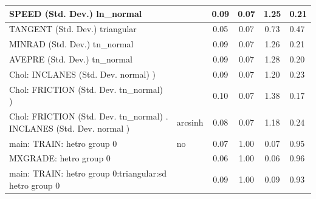 \begin{table}
\begin{center}
\begin{tabular}{|l|l|c|c|c|l|}
			\hline
			SPEED (Std. Dev.) ln_normal &  & 0.09 & 0.07 & 1.25 & 0.21 \\
			\hline
			TANGENT (Std. Dev.) triangular &  & 0.05 & 0.07 & 0.73 & 0.47 \\
			\hline
			MINRAD (Std. Dev.) tn_normal &  & 0.09 & 0.07 & 1.26 & 0.21 \\
			\hline
			AVEPRE (Std. Dev.) tn_normal &  & 0.09 & 0.07 & 1.28 & 0.20 \\
			\hline
			 Chol: INCLANES (Std. Dev. normal) ) &  & 0.09 & 0.07 & 1.20 & 0.23 \\
			\hline
			 Chol: FRICTION (Std. Dev. tn_normal) ) &  & 0.10 & 0.07 & 1.38 & 0.17 \\
			\hline
			 Chol: FRICTION (Std. Dev. tn_normal) . INCLANES (Std. Dev.   normal ) & arcsinh & 0.08 & 0.07 & 1.18 & 0.24 \\
			\hline
			main: TRAIN: hetro group 0 & no & 0.07 & 1.00 & 0.07 & 0.95 \\
			\hline
			MXGRADE: hetro group 0 &  & 0.06 & 1.00 & 0.06 & 0.96 \\
			\hline
			main: TRAIN: hetro group 0:triangular:sd  hetro group 0 &  & 0.09 & 1.00 & 0.09 & 0.93 \\
			\hline
		\end{tabular}
	\end{center}
\end{table}